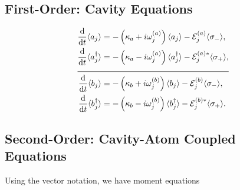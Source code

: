 \documentclass{article}
\newcommand{\ddt}[1][]{\frac{\mathrm{d} #1}{\mathrm{d}t}}
\begin{document}
\subsection{First-Order: Cavity Equations}

\begin{subequations}
	\begin{align}
		\ddt \langle a_{j} \rangle &= -\left( \kappa_{a} + i \omega_{j}^{(a)} \right) \langle a_{j} \rangle - \mathcal{E}_{j}^{(a)} \langle \sigma_{-} \rangle, \\
		\ddt \langle a^{\dagger}_{j} \rangle &= -\left( \kappa_{a} - i \omega_{j}^{(a)} \right) \langle a^{\dagger}_{j} \rangle - \mathcal{E}_{j}^{(a) *} \langle \sigma_{+} \rangle, \\
		\cline{1-2}
		\ddt \langle b_{j} \rangle &= -\left( \kappa_{b} + i \omega_{j}^{(b)} \right) \langle b_{j} \rangle - \mathcal{E}_{j}^{(b)} \langle \sigma_{-} \rangle, \\
		\ddt \langle b^{\dagger}_{j} \rangle &= -\left( \kappa_{b} - i \omega_{j}^{(b)} \right) \langle b^{\dagger}_{j} \rangle - \mathcal{E}_{j}^{(b) *} \langle \sigma_{+} \rangle.
	\end{align}
\end{subequations}

\subsection{Second-Order: Cavity-Atom Coupled Equations}

Using the vector notation, we have moment equations
\end{document}
